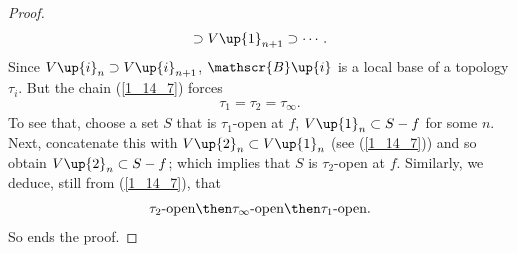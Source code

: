 \begin{proof}
\begin{align}
      \supset 
    V\up{1}_{n+1} 
      \supset 
    \cdots .
  \end{align}
%
Since 
  $V\up{i}_n\supset V\up{i}_{n+1}$, 
$\mathscr{B}\up{i}$ is a local base of a topology $\tau_i$. 
But the chain (\ref{1_14_7}) forces %
%
  \begin{align}
    \tau_1 = \tau_2 = \tau_\infty.
  \end{align}
%
To see that, choose a set $S$ that is $\tau_1$-open at $f$, \ie 
%
  $V\up{1}_n \subset S-f$  
%
for some $n$. Next, concatenate this with %
%
  $V\up{2}_n \subset V\up{1}_n$ (see (\ref{1_14_7})) %
%
and so obtain  
%
  $V\up{2}_n \subset S-f$; 
%
which implies that $S$ is $\tau_2$-open at $f$.
Similarly, we deduce, still from (\ref{1_14_7}), that 
\begin{align}
  \tau_2\text{-open} 
    \then 
  \tau_\infty\text{-open} 
    \then 
  \tau_1\text{-open}.
\end{align}
So ends the proof.
\end{proof}





